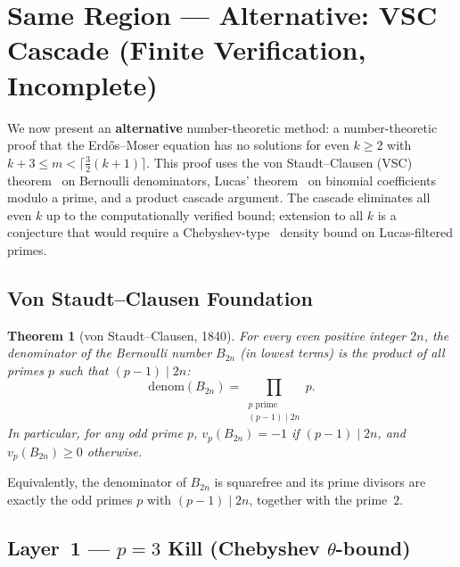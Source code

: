 \documentclass[12pt,a4paper]{article}
\theoremstyle{plain}
\newtheorem{theorem}{Theorem}[section]
\theoremstyle{definition}
\begin{document}
\section{Same Region --- Alternative: VSC Cascade (Finite Verification, Incomplete)}
\label{sec:vsc-cascade}

We now present an \textbf{alternative} number-theoretic method: a
number-theoretic proof that the Erd\H{o}s--Moser equation has no solutions
for even $k \ge 2$ with $k+3 \le m < \lceil\frac{3}{2}(k+1)\rceil$.
This proof uses the von Staudt--Clausen (VSC) theorem~\cite{vonStaudt,Clausen}
on Bernoulli denominators, Lucas' theorem~\cite{Lucas} on binomial
coefficients modulo a prime, and a product cascade argument.
The cascade eliminates all even $k$ up to the computationally verified
bound; extension to all $k$ is a conjecture that would require a
Chebyshev-type~\cite{Chebyshev} density bound on Lucas-filtered primes.

\subsection{Von Staudt--Clausen Foundation}
\label{sec:vsc-theorem}

\begin{theorem}[von Staudt--Clausen, 1840]\label{thm:vsc}
  For every even positive integer $2n$, the denominator of the Bernoulli
  number $B_{2n}$ (in lowest terms) is the product of all primes $p$ such
  that $(p-1) \mid 2n$:
  \begin{equation}\label{eq:vsc}
    \mathrm{denom}(B_{2n}) = \prod_{\substack{p \text{ prime} \\ (p-1) \mid 2n}} p.
  \end{equation}
  In particular, for any odd prime $p$, $v_p(B_{2n}) = -1$ if
  $(p-1) \mid 2n$, and $v_p(B_{2n}) \ge 0$ otherwise.
\end{theorem}

Equivalently, the denominator of $B_{2n}$ is squarefree and its prime
divisors are exactly the odd primes $p$ with $(p-1) \mid 2n$, together
with the prime~$2$.

\subsection{Layer~1 --- $p=3$ Kill (Chebyshev $\theta$-bound)}
\label{sec:layer1}
\end{document}
